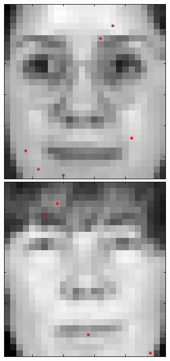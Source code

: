 \begin{figure}[ht]
 \includegraphics[width=\textwidth*11/100]{ch5/figures/XM2VTS_6_0.png}
 \includegraphics[width=\textwidth*11/100]{ch5/figures/XM2VTS_7_0.png}

\end{figure}
